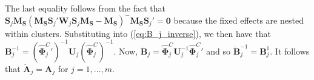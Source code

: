 \documentclass[12pt]{article}\usepackage[]{graphicx}\usepackage[]{color}
\newcommand{\bm}{\mathbf}
\newcommand{\bs}{\boldsymbol}
\begin{document}
The last equality follows from the fact that $\bm{S}_j \bm{M_S}\left(\bm{M_S}\bm{S}_j' \bm{W}_j \bm{S}_j\bm{M_S} - \bm{M_S}\right)^{-} \bm{M_S} \bm{S}_j' = \bm{0}$ because the fixed effects are nested within clusters. 
Substituting into (\ref{eq:B_j_inverse}), we then have that $\bm{B}_j^{-1} = \left({\bs{\hat\Phi}_j^C}'\right)^{-1} \bm{U}_j \left(\bs{\hat\Phi}_j^C\right)^{-1}$. 
Now, $\bm{\ddot{B}}_j = \hat{\bs\Phi}_j^C \bm{U}_j^{-1} {\bs{\hat\Phi}_j^C}'$ and so $\bm{\ddot{B}}_j^{-1} = \bm{B}_j^{1}$. It follows that $\bm{\ddot{A}}_j = \bm{A}_j$ for $j = 1,...,m$. 



\end{document}
